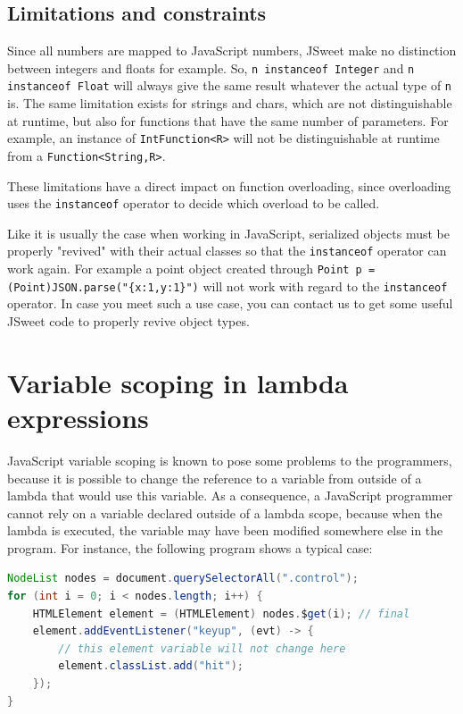 \documentclass[a4paper]{report}
\begin{document}
\subsection{Limitations and constraints}

Since all numbers are mapped to JavaScript numbers, JSweet make no distinction between integers and floats for example. So, \texttt{n instanceof Integer} and \texttt{n instanceof Float} will always give the same result whatever the actual type of \texttt{n} is. The same limitation exists for strings and chars, which are not distinguishable at runtime, but also for functions that have the same number of parameters. For example, an instance of \texttt{IntFunction<R>} will not be distinguishable at runtime from a \texttt{Function<String,R>}. 

These limitations have a direct impact on function overloading, since overloading uses the \texttt{instanceof} operator to decide which overload to be called.

Like it is usually the case when working in JavaScript, serialized objects must be properly "revived" with their actual classes so that the \texttt{instanceof} operator can work again. For example a point object created through \texttt{Point p = (Point)JSON.parse("\{x:1,y:1\}")} will not work with regard to the \texttt{instanceof} operator. In case you meet such a use case, you can contact us to get some useful JSweet code to properly revive object types.

\section{Variable scoping in lambda expressions}

JavaScript variable scoping is known to pose some problems to the programmers, because it is possible to change the reference to a variable from outside of a lambda that would use this variable. As a consequence, a JavaScript programmer cannot rely on a variable declared outside of a lambda scope, because when the lambda is executed, the variable may have been modified somewhere else in the program. For instance, the following program shows a typical case: 

\begin{lstlisting}[language=Java]
NodeList nodes = document.querySelectorAll(".control");
for (int i = 0; i < nodes.length; i++) {
	HTMLElement element = (HTMLElement) nodes.$get(i); // final
	element.addEventListener("keyup", (evt) -> {
	    // this element variable will not change here 
		element.classList.add("hit");
	});
}
\end{lstlisting}
\end{document}
